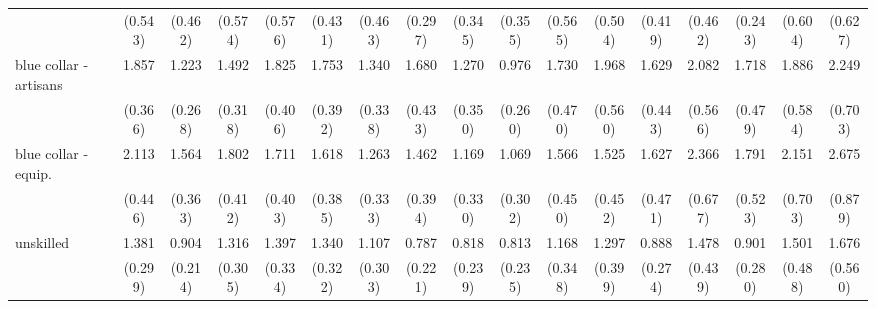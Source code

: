 {\begin{tabular}{l*{16}{c}}
                    &     (0.543)         &     (0.462)         &     (0.574)         &     (0.576)         &     (0.431)         &     (0.463)         &     (0.297)         &     (0.345)         &     (0.355)         &     (0.565)         &     (0.504)         &     (0.419)         &     (0.462)         &     (0.243)         &     (0.604)         &     (0.627)         \\
[1em]
blue collar - artisans&       1.857\sym{**} &       1.223         &       1.492         &       1.825\sym{**} &       1.753\sym{*}  &       1.340         &       1.680\sym{*}  &       1.270         &       0.976         &       1.730\sym{*}  &       1.968\sym{*}  &       1.629         &       2.082\sym{**} &       1.718         &       1.886\sym{*}  &       2.249\sym{**} \\
                    &     (0.366)         &     (0.268)         &     (0.318)         &     (0.406)         &     (0.392)         &     (0.338)         &     (0.433)         &     (0.350)         &     (0.260)         &     (0.470)         &     (0.560)         &     (0.443)         &     (0.566)         &     (0.479)         &     (0.584)         &     (0.703)         \\
[1em]
blue collar - equip.&       2.113\sym{***}&       1.564         &       1.802\sym{**} &       1.711\sym{*}  &       1.618\sym{*}  &       1.263         &       1.462         &       1.169         &       1.069         &       1.566         &       1.525         &       1.627         &       2.366\sym{**} &       1.791\sym{*}  &       2.151\sym{*}  &       2.675\sym{**} \\
                    &     (0.446)         &     (0.363)         &     (0.412)         &     (0.403)         &     (0.385)         &     (0.333)         &     (0.394)         &     (0.330)         &     (0.302)         &     (0.450)         &     (0.452)         &     (0.471)         &     (0.677)         &     (0.523)         &     (0.703)         &     (0.879)         \\
[1em]
unskilled           &       1.381         &       0.904         &       1.316         &       1.397         &       1.340         &       1.107         &       0.787         &       0.818         &       0.813         &       1.168         &       1.297         &       0.888         &       1.478         &       0.901         &       1.501         &       1.676         \\
                    &     (0.299)         &     (0.214)         &     (0.305)         &     (0.334)         &     (0.322)         &     (0.303)         &     (0.221)         &     (0.239)         &     (0.235)         &     (0.348)         &     (0.399)         &     (0.274)         &     (0.439)         &     (0.280)         &     (0.488)         &     (0.560)         \\

\end{tabular}}
